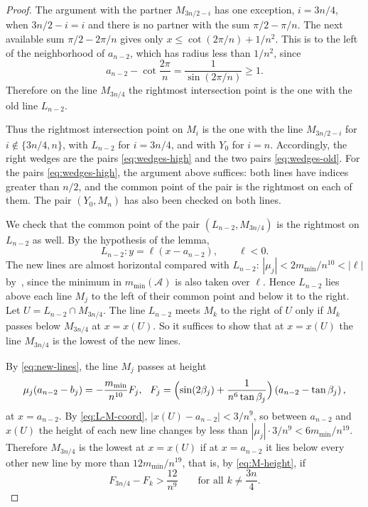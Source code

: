 \begin{proof}
The argument with the partner $M_{3n/2-i}$ has one exception, $i=3n/4$, when $3n/2-i=i$ and there is no partner with the sum $\pi/2-\pi/n$.
The next available sum $\pi/2-2\pi/n$ gives only $x\le\cot(2\pi/n)+1/n^{2}$.
This is to the left of the neighborhood of $a_{n-2}$, which has radius less than $1/n^{2}$, since
\[
a_{n-2}-\cot\frac{2\pi}n=\frac1{\sin(2\pi/n)}\ge1 .
\]
Therefore on the line $M_{3n/4}$ the rightmost intersection point is the one with the old line $L_{n-2}$.

Thus the rightmost intersection point on $M_i$ is the one with the line $M_{3n/2-i}$ for $i\notin\{3n/4,n\}$, with $L_{n-2}$ for $i=3n/4$, and with $Y_0$ for $i=n$.
Accordingly, the right wedges are the pairs \eqref{eq:wedges-high} and the two pairs \eqref{eq:wedges-old}.
For the pairs \eqref{eq:wedges-high}, the argument above suffices: both lines have indices greater than $n/2$, and the common point of the pair is the rightmost on each of them.
The pair $(Y_0,M_n)$ has also been checked on both lines.

We check that the common point of the pair $(L_{n-2},M_{3n/4})$ is the rightmost on $L_{n-2}$ as well.
By the hypothesis of the lemma,
\[
L_{n-2}:y=\ell(x-a_{n-2}),
\qquad \ell<0.
\]
The new lines are almost horizontal compared with $L_{n-2}$: $|\mu_j|<2m_{\min}/n^{10}<|\ell|$ by~\cite[(3)]{bbl}, since the minimum in $m_{\min}(\mathcal A)$ is also taken over $\ell$.
Hence $L_{n-2}$ lies above each line $M_j$ to the left of their common point and below it to the right.
Let $U=L_{n-2}\cap M_{3n/4}$. The line $L_{n-2}$ meets $M_k$ to the right of $U$ only if $M_k$ passes below $M_{3n/4}$ at $x=x(U)$.
So it suffices to show that at $x=x(U)$ the line $M_{3n/4}$ is the lowest of the new lines.

By \eqref{eq:new-lines}, the line $M_j$ passes at height
\begin{equation}\label{eq:M-height}
\mu_j(a_{n-2}-b_j)=-\frac{m_{\min}}{n^{10}}F_j,
\quad\!\!
F_j=\Bigl(\sin(2\beta_j)+\frac1{n^6\tan\beta_j}\Bigr)\left(a_{n-2}-\tan\beta_j\right),
\end{equation}
at $x=a_{n-2}$.
By \eqref{eq:L-M-coord}, $|x(U)-a_{n-2}|<3/n^9$, so between $a_{n-2}$ and $x(U)$ the height of each new line changes by less than $|\mu_j|\cdot3/n^9<6m_{\min}/n^{19}$.
Therefore $M_{3n/4}$ is the lowest at $x=x(U)$ if at $x=a_{n-2}$ it lies below every other new line by more than $12m_{\min}/n^{19}$, that is, by \eqref{eq:M-height}, if
\begin{equation}\label{eq:F-gap}
F_{3n/4}-F_k>\frac{12}{n^9}
\qquad\text{for all }k\neq\frac{3n}4.
\end{equation}


\end{proof}
